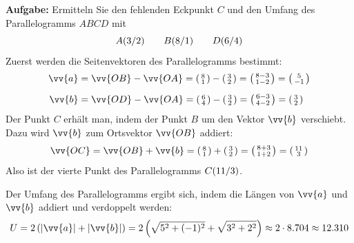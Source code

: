 \textbf{Aufgabe:} Ermitteln Sie den fehlenden Eckpunkt $C$ und den Umfang des Parallelogramms $ABCD$ mit
\[
  \coord[A]{3,2} \qquad \coord[B]{8,1} \qquad \coord[D]{6,4}
\]
Zuerst werden die Seitenvektoren des Parallelogramms bestimmt:
\begin{align*}
  \vv{a} &= \vv{OB}-\vv{OA} = \tvec{8,1}-\tvec{3,2} = \tvec{8-3,1-2} = \tvec{5,-1} \\[2mm]
  \vv{b} &= \vv{OD}-\vv{OA} = \tvec{6,4}-\tvec{3,2} = \tvec{6-3,4-2} = \tvec{3,2}
\end{align*}
Der Punkt $C$ erhält man, indem der Punkt $B$ um den Vektor $\vv{b}$ verschiebt. Dazu wird $\vv{b}$ zum Ortsvektor $\vv{OB}$ addiert:
\[
  \vv{OC} = \vv{OB} + \vv{b} = \tvec{8,1} + \tvec{3,2} = \tvec{8+3,1+2} = \tvec{11,3}
\]
Also ist der vierte Punkt des Parallelogramms $\coord[C]{11,3}$.
\begin{center}
\end{center}
Der Umfang des Parallelogramms ergibt sich, indem die Längen von $\vv{a}$ und $\vv{b}$ addiert und verdoppelt werden:
\[
  U = 2\left(|\vv{a}| + |\vv{b}|\right) = 2\left(\sqrt{5^{2}+(-1)^2}+\sqrt{3^{2}+2^{2}}\right) \approx 2\cdot 8.704 \approx 12.310
\]

